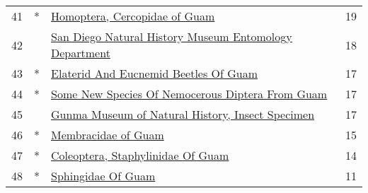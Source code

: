 \begin{longtable}{llp{5in}r}
41 &  * &                                                                                                                                                                    \href{https://www.gbif.org/dataset/cbd6479d-ac43-4609-ab60-e69de966ed9c}{Homoptera, Cercopidae of Guam} &            19 \\
42 &    &                                                                                                                                           \href{https://www.gbif.org/dataset/0d8d90f4-973a-46a1-9ea1-55b0c7b222ea}{San Diego Natural History Museum Entomology Department} &            18 \\
43 &  * &                                                                                                                                                            \href{https://www.gbif.org/dataset/13d05d68-bf03-4cfb-b96c-b7017e829854}{Elaterid And Eucnemid Beetles Of Guam} &            17 \\
44 &  * &                                                                                                                                                 \href{https://www.gbif.org/dataset/3efb1a4f-0515-49ba-9d61-b7c1b4326613}{Some New Species Of Nemocerous Diptera From Guam} &            17 \\
45 &    &                                                                                                                                                 \href{https://www.gbif.org/dataset/95f74c02-f762-11e1-a439-00145eb45e9a}{Gunma Museum of Natural History, Insect Specimen} &            17 \\
46 &  * &                                                                                                                                                                              \href{https://www.gbif.org/dataset/38b66f4f-97ce-4458-822b-c6c3dcff3ba7}{Membracidae of Guam} &            15 \\
47 &  * &                                                                                                                                                                \href{https://www.gbif.org/dataset/797184fa-5b39-4a0e-8810-fb8e630838fd}{Coleoptera, Staphylinidae Of Guam} &            14 \\
48 &  * &                                                                                                                                                                               \href{https://www.gbif.org/dataset/2930c6b8-746b-45ac-96c0-1fd19de653bb}{Sphingidae Of Guam} &            11 \\

\end{longtable}
